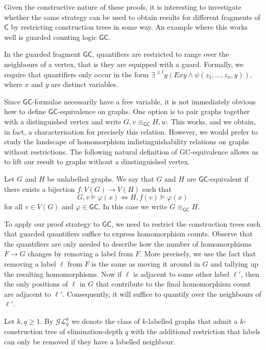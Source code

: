 \documentclass{lmcs}
\theoremstyle{plain}\newtheorem{claim}[thm]{Claim}   %
\newcommand{\cG}{\ensuremath{\mathcal G}}
\newcommand{\cL}{\ensuremath{\mathcal L}}
\newcommand{\Lkq}{\ensuremath{\cL_{q}^{k}}}
\newcommand{\GEkq}{\ensuremath{\cG\Lkq}}
\newcommand{\lC} {\ensuremath{\mathsf C}}
\newcommand{\lGC}{\ensuremath{\mathsf{GC}}}
\begin{document}
Given the constructive nature of these proofs, it is interesting to investigate whether the same strategy can be used to obtain results for different fragments of $\lC$ by restricting construction trees in some way.
An example where this works well is guarded counting logic $\lGC$.

In the guarded fragment $\lGC$, quantifiers are restricted to range over the neighbours of a vertex, that is they are equipped with a guard.
Formally, we require that quantifiers only occur in the form $\exists^{{\geq} t}y (Exy \land \psi(z_1, \dots, z_n, y))$, where $x$ and $y$ are distinct variables.

Since $\lGC$-formulae necessarily have a free variable, it is not immediately obvious how to define $\lGC$-equivalence on graphs.
One option is to pair graphs together with a distinguished vertex and write $G, v \equiv_\lGC H, w$.
This works, and we obtain, in fact, a characterisation for precisely this relation.
However, we would prefer to study the landscape of homomorphism indistinguishability relations on graphs without restrictions.
The following natural definition of \textsf{GC}-equivalence allows us to lift our result to graphs without a dinstinguished vertex.

\begin{defi}\label{def:gcequiv}
	Let $G$ and $H$ be unlabelled graphs.
	We say that $G$ and $H$ are $\textsf{GC}$-equivalent if there exists a bijection $f \colon V(G) \to V(H)$ such that
	\[G, v \models \varphi(x) \iff H, f(v) \models \varphi(x)\]
	for all $v \in V(G)$ and $\varphi \in \mathsf{GC}$.
	In this case we write $G \equiv_{\mathsf{GC}} H$.
\end{defi}

To apply our proof strategy to $\lGC$, we need to restrict the construction trees such that guarded quantifiers suffice to express homomorphism counts.
Observe that the quantifiers are only needed to describe how the number of homomorphisms $F \to G$ changes by removing a label from $F$.
More precisely, we use the fact that removing a label $\ell$ from $F$ is the same as moving it around in $G$ and tallying up the resulting homomorphisms.
Now if $\ell$ is adjacent to some other label $\ell'$, then the only positions of $\ell$ in $G$ that contribute to the final homomorphism count are adjacent to $\ell'$.
Consequently, it will suffice to quantify over the neighbours of $\ell'$.

\begin{defi}
	Let $k, q \geq 1$.
	By $\GEkq$ we denote the class of $k$-labelled graphs that admit a $k$-construction tree of elimination-depth $q$ with the additional restriction that labels can only be removed if they have a labelled neighbour.
\end{defi}
\end{document}

